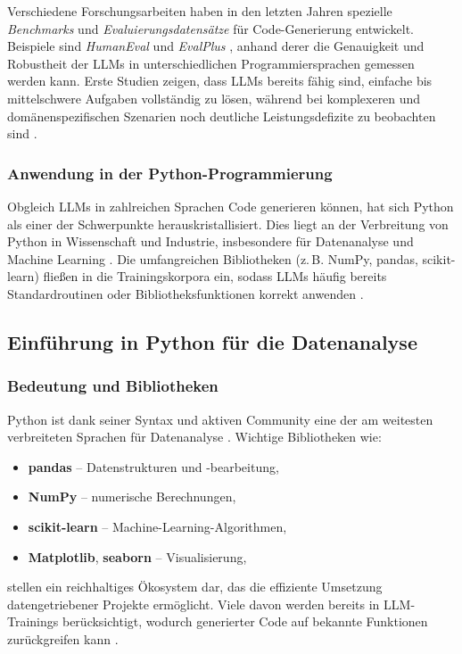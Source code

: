 \documentclass[11pt,a4paper]{article}
\begin{document}
Verschiedene Forschungsarbeiten haben in den letzten Jahren spezielle \emph{Benchmarks} und \emph{Evaluierungsdatensätze} für Code-Generierung entwickelt. Beispiele sind \emph{HumanEval} \cite{web:3} und \emph{EvalPlus} \cite{web:4}, anhand derer die Genauigkeit und Robustheit der LLMs in unterschiedlichen Programmiersprachen gemessen werden kann. Erste Studien zeigen, dass LLMs bereits fähig sind, einfache bis mittelschwere Aufgaben vollständig zu lösen, während bei komplexeren und domänenspezifischen Szenarien noch deutliche Leistungsdefizite zu beobachten sind \cite{web:6}.

\subsubsection{Anwendung in der Python-Programmierung}
Obgleich LLMs in zahlreichen Sprachen Code generieren können, hat sich Python als einer der Schwerpunkte herauskristallisiert. Dies liegt an der Verbreitung von Python in Wissenschaft und Industrie, insbesondere für Datenanalyse und Machine Learning \cite{web:5}. Die umfangreichen Bibliotheken (z.\,B. NumPy, pandas, scikit-learn) fließen in die Trainingskorpora ein, sodass LLMs häufig bereits Standardroutinen oder Bibliotheksfunktionen korrekt anwenden \cite{web:2}.

\subsection{Einführung in Python für die Datenanalyse}
\label{sec:Python}

\subsubsection{Bedeutung und Bibliotheken}
Python ist dank seiner Syntax und aktiven Community eine der am weitesten verbreiteten Sprachen für Datenanalyse \cite{web:6}. Wichtige Bibliotheken wie:
\begin{itemize}
    \item \textbf{pandas} -- Datenstrukturen und -bearbeitung,
    \item \textbf{NumPy} -- numerische Berechnungen,
    \item \textbf{scikit-learn} -- Machine-Learning-Algorithmen,
    \item \textbf{Matplotlib}, \textbf{seaborn} -- Visualisierung,
\end{itemize}
stellen ein reichhaltiges Ökosystem dar, das die effiziente Umsetzung datengetriebener Projekte ermöglicht. Viele davon werden bereits in LLM-Trainings berücksichtigt, wodurch generierter Code auf bekannte Funktionen zurückgreifen kann \cite{web:4}.
\end{document}
